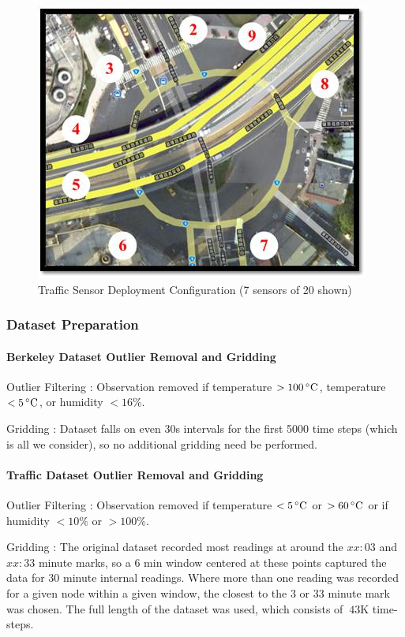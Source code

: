 \begin{figure}[H]
\centering
\includegraphics[scale=0.5]{traffic_wsn.png}
\caption{Traffic Sensor Deployment Configuration (7 sensors of 20 shown)}
\end{figure}

\subsubsection{Dataset Preparation}

\paragraph*{Berkeley Dataset Outlier Removal and Gridding}

Outlier Filtering : Observation removed if temperature $> 100\,^{\circ}\mathrm{C}$, temperature $< 5\,^{\circ}\mathrm{C}$, or humidity $< 16\%$.

Gridding : Dataset falls on even 30s intervals for the first 5000 time steps (which is all we consider), so no additional gridding need be performed.

\paragraph*{Traffic Dataset Outlier Removal and Gridding}

Outlier Filtering : Observation removed if temperature $< 5\,^{\circ}\mathrm{C}$ or $> 60\,^{\circ}\mathrm{C}$ or if humidity $< 10\%$ or $> 100\%$.

Gridding : The original dataset recorded most readings at around the $xx:03$ and $xx:33$ minute marks, so a $6$ min window centered at
these points captured the data for $30$ minute internal readings.
Where more than one reading was recorded for a given node within a given window, the closest to the $3$ or $33$ minute mark was chosen.
The full length of the dataset was used, which consists of $~43$K time-steps.

